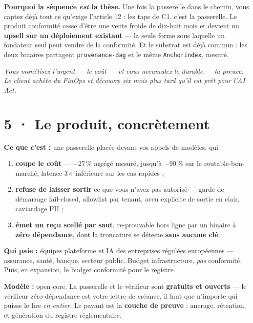 \documentclass[10pt]{article}
\newcommand{\code}[1]{\texttt{\small #1}}
\newcommand{\x}{$\times$}
\newcommand{\pc}{\,\%}
\begin{document}
\textbf{Pourquoi la séquence \emph{est} la thèse.} Une fois la passerelle dans le chemin, vous captez
déjà tout ce qu'exige l'article 12 : les taps de C1, c'est la passerelle. Le produit conformité cesse
d'être une vente froide de dix-huit mois et devient un \textbf{upsell sur un déploiement existant} ---
la seule forme sous laquelle un fondateur seul peut vendre de la conformité. Et le substrat est déjà
commun : les deux binaires partagent \code{provenance-dag} et le même \code{AnchorIndex}, mesuré.

\begin{center}\small\itshape
Vous monétisez l'urgent --- le coût --- et vous accumulez le durable --- la preuve. \\
Le client achète du FinOps et découvre six mois plus tard qu'il est prêt pour l'AI Act.
\end{center}

\section{5 · Le produit, concrètement}

\textbf{Ce que c'est :} une passerelle placée devant vos appels de modèles, qui

\begin{enumerate}[leftmargin=1.5em,itemsep=1.5pt,topsep=2pt]
\item \textbf{coupe le coût} --- $-$27\pc{} agrégé mesuré, jusqu'à $-$90\pc{} sur le
      routable-bon-marché, latence 3\x{} inférieure sur les cas rapides ;
\item \textbf{refuse de laisser sortir} ce que vous n'avez pas autorisé --- garde de démarrage
      fail-closed, allowlist par tenant, aveu explicite de sortie en clair, caviardage PII ;
\item \textbf{émet un reçu scellé par saut}, re-prouvable hors ligne par un binaire à \textbf{zéro
      dépendance}, dont la troncature se détecte \textbf{sans aucune clé}.
\end{enumerate}

\textbf{Qui paie :} équipes plateforme et IA des entreprises régulées européennes --- assurance, santé,
banque, secteur public. Budget infrastructure, \emph{pas} conformité. Puis, en expansion, le budget
conformité pour le registre.

\textbf{Modèle :} open-core. La passerelle et le vérifieur sont \textbf{gratuits et ouverts} --- le
vérifieur zéro-dépendance est votre lettre de créance, il faut que n'importe qui puisse le lire
\emph{en entier}. Le payant est la \textbf{couche de preuve} : ancrage, rétention, et génération du
registre réglementaire.
\end{document}
